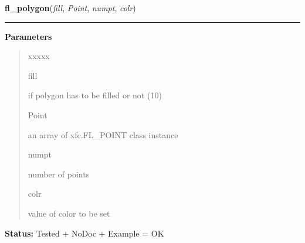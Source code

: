    \label{xformslib:library:fl_polygon}

    \vspace{0.5ex}

\hspace{.8\funcindent}\begin{boxedminipage}{\funcwidth}

    \raggedright \textbf{fl\_polygon}(\textit{fill}, \textit{Point}, \textit{numpt}, \textit{colr})

    \vspace{-1.5ex}

    \rule{\textwidth}{0.5\fboxrule}
\setlength{\parskip}{2ex}
\setlength{\parskip}{1ex}
      \textbf{Parameters}
      \vspace{-1ex}

      \begin{quote}
        \begin{Ventry}{xxxxx}

          \item[fill]

          if polygon has to be filled or not (1{\textbar}0)

          \item[Point]

          an array of xfc.FL\_POINT class instance

          \item[numpt]

          number of points

          \item[colr]

          value of color to be set

        \end{Ventry}

      \end{quote}

\textbf{Status:} Tested + NoDoc + Example = OK



    \end{boxedminipage}

    \label{xformslib:library:fl_polyf}

    \vspace{0.5ex}

